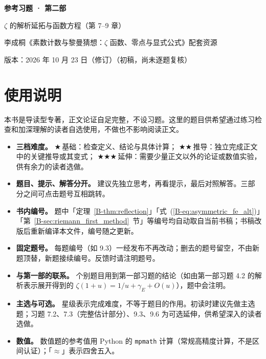 \documentclass[11pt,a4paper]{article}
\newcommand{\bref}[1]{\ref*{B-#1}}
\newcommand{\lvI}{$\bigstar$\,基础}
\newcommand{\lvII}{$\bigstar\bigstar$\,推导}
\newcommand{\lvIII}{$\bigstar\bigstar\bigstar$\,延伸}
\newcommand{\versiondate}{2026 年 10 月 23 日（修订）}
\begin{document}
\begin{center}
{\LARGE\bfseries 参考习题 · 第二部\par}
\vspace{0.6em}
{\large $\zeta$ 的解析延拓与函数方程（第 7–9 章）\par}
\vspace{0.6em}
{\normalsize 李成桐《素数计数与黎曼猜想：$\zeta$ 函数、零点与显式公式》配套资源\par}
\vspace{0.3em}
{\small 版本：\versiondate（初稿，尚未逐题复核）\par}
\end{center}

\vspace{0.8em}
\section*{使用说明}

本书是导读型专著，正文论证自足完整，不设习题。这里的题目供希望通过练习检查和加深理解的读者自选使用，不做也不影响阅读正文。

\begin{itemize}
  \item \textbf{三档难度。}
    \lvI：检查定义、结论与具体计算；
    \lvII：独立完成正文中的关键推导或其变式；
    \lvIII：需要少量正文以外的论证或数值实验，供有余力的读者选做。
  \item \textbf{题目、提示、解答分开。}
    建议先独立思考，再看提示，最后对照解答。三部分之间可点击题号互相跳转。
  \item \textbf{书内编号。}
    题中「定理~\bref{thm:reflection}」「式~(\bref{eq:asymmetric_fe_alt})」「第~\bref{sec:riemann_first_method}~节」等编号均自动取自当前书稿；书稿改版后重新编译本文件，编号随之更新。
  \item \textbf{固定题号。}
    每题编号（如 9.3）一经发布不再改动；删去的题号留空，不由新题顶替，新题接续编号。反馈时请注明题号。
  \item \textbf{与第一部的联系。}
    个别题目用到第一部习题的结论（如由第一部习题 4.2 的解析表示展开得到的 $\zeta(1+u)=1/u+\gamma_E+O(u)$），题中会注明。
  \item \textbf{主选与可选。}
    星级表示完成难度，不等于题目的作用。初读时建议先做主选题；习题 7.2、7.3（完整估计部分）、9.3、9.6 为可选延伸，供希望深入的读者选做。
  \item \textbf{数值。}
    数值题的参考值用 Python 的 \texttt{mpmath} 计算（常规高精度计算，不是区间认证）；「$\approx$」表示四舍五入。
\end{itemize}
\end{document}
